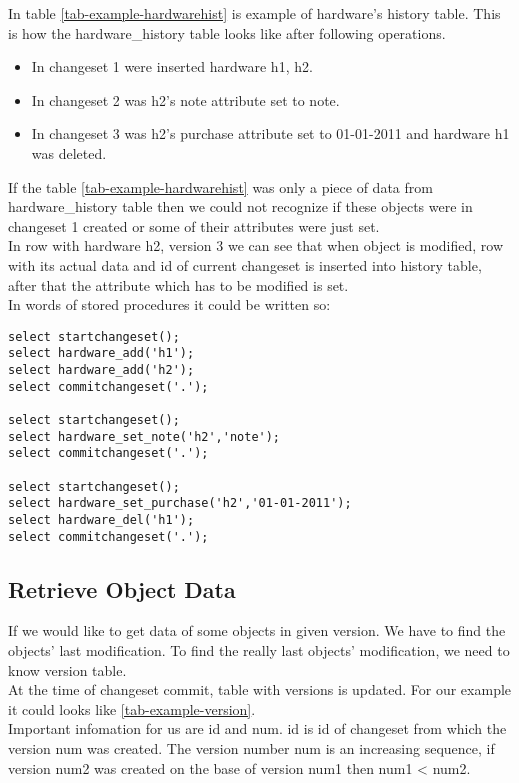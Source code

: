 \documentclass[deska]{subfiles}
\begin{document}
In table \ref{tab-example-hardwarehist} is example of hardware's history table. This is how the hardware\_history table looks like after following operations. 
\begin{itemize}
    \item In changeset 1 were inserted hardware h1, h2.
    \item In changeset 2 was h2's note attribute set to note.
    \item In changeset 3 was h2's purchase attribute set to 01-01-2011 and hardware h1 was deleted.
\end{itemize}


If the table \ref{tab-example-hardwarehist} was only a piece of data from hardware\_history table then we could not recognize if these objects were in changeset 1 created or some of their attributes were just set.\\
In row with hardware h2, version 3 we can see that when object is modified, row with its actual data and id of current changeset is inserted into history table, after that the attribute which has to be modified is set.\\
In words of stored procedures it could be written so:\\

\begin{verbatim}
select startchangeset();
select hardware_add('h1');
select hardware_add('h2');
select commitchangeset('.');

select startchangeset();
select hardware_set_note('h2','note');
select commitchangeset('.');

select startchangeset();
select hardware_set_purchase('h2','01-01-2011');
select hardware_del('h1');
select commitchangeset('.');
\end{verbatim}

\subsection{Retrieve Object Data}

If we would like to get data of some objects in given version. We have to find the objects' last modification. To find the really last objects' modification, we need to know version table.\\
At the time of changeset commit, table with versions is updated. For our example it could looks like \ref{tab-example-version}.\\
Important infomation for us are id and num. id is id of changeset from which the version num was created. The version number num is an increasing sequence, if version num2 was created on the base of version num1 then num1 < num2.
\end{document}

